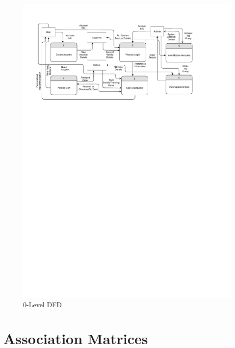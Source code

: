 \begin{figure}[H]
\includegraphics[width=15cm]{images/dfd0.pdf} 
\centering
\caption{0-Level DFD}
\label{dfd:zero}
\end{figure}

\section{Association Matrices}

